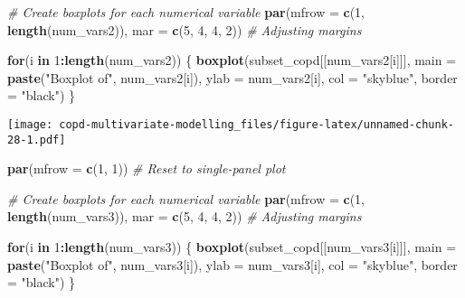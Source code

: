 \documentclass[
]{article}
\newenvironment{Shaded}{\begin{snugshade}}{\end{snugshade}}
\newcommand{\AttributeTok}[1]{\textcolor[rgb]{0.13,0.29,0.53}{#1}}
\newcommand{\CommentTok}[1]{\textcolor[rgb]{0.56,0.35,0.01}{\textit{#1}}}
\newcommand{\ControlFlowTok}[1]{\textcolor[rgb]{0.13,0.29,0.53}{\textbf{#1}}}
\newcommand{\DecValTok}[1]{\textcolor[rgb]{0.00,0.00,0.81}{#1}}
\newcommand{\FunctionTok}[1]{\textcolor[rgb]{0.13,0.29,0.53}{\textbf{#1}}}
\newcommand{\NormalTok}[1]{#1}
\newcommand{\SpecialCharTok}[1]{\textcolor[rgb]{0.81,0.36,0.00}{\textbf{#1}}}
\newcommand{\StringTok}[1]{\textcolor[rgb]{0.31,0.60,0.02}{#1}}
\begin{document}
\begin{Shaded}
\begin{Highlighting}[]
\CommentTok{\# Create boxplots for each numerical variable}
\FunctionTok{par}\NormalTok{(}\AttributeTok{mfrow =} \FunctionTok{c}\NormalTok{(}\DecValTok{1}\NormalTok{, }\FunctionTok{length}\NormalTok{(num\_vars2)), }\AttributeTok{mar =} \FunctionTok{c}\NormalTok{(}\DecValTok{5}\NormalTok{, }\DecValTok{4}\NormalTok{, }\DecValTok{4}\NormalTok{, }\DecValTok{2}\NormalTok{))  }\CommentTok{\# Adjusting margins}

\ControlFlowTok{for}\NormalTok{(i }\ControlFlowTok{in} \DecValTok{1}\SpecialCharTok{:}\FunctionTok{length}\NormalTok{(num\_vars2)) \{}
  \FunctionTok{boxplot}\NormalTok{(subset\_copd[[num\_vars2[i]]], }\AttributeTok{main =} \FunctionTok{paste}\NormalTok{(}\StringTok{"Boxplot of"}\NormalTok{, num\_vars2[i]), }
          \AttributeTok{ylab =}\NormalTok{ num\_vars2[i], }\AttributeTok{col =} \StringTok{"skyblue"}\NormalTok{, }\AttributeTok{border =} \StringTok{"black"}\NormalTok{)}
\NormalTok{\}}
\end{Highlighting}
\end{Shaded}

\texttt{[image: copd-multivariate-modelling\_files/figure-latex/unnamed-chunk-28-1.pdf]}

\begin{Shaded}
\begin{Highlighting}[]
\FunctionTok{par}\NormalTok{(}\AttributeTok{mfrow =} \FunctionTok{c}\NormalTok{(}\DecValTok{1}\NormalTok{, }\DecValTok{1}\NormalTok{))  }\CommentTok{\# Reset to single{-}panel plot}
\end{Highlighting}
\end{Shaded}

\begin{Shaded}
\begin{Highlighting}[]
\CommentTok{\# Create boxplots for each numerical variable}
\FunctionTok{par}\NormalTok{(}\AttributeTok{mfrow =} \FunctionTok{c}\NormalTok{(}\DecValTok{1}\NormalTok{, }\FunctionTok{length}\NormalTok{(num\_vars3)), }\AttributeTok{mar =} \FunctionTok{c}\NormalTok{(}\DecValTok{5}\NormalTok{, }\DecValTok{4}\NormalTok{, }\DecValTok{4}\NormalTok{, }\DecValTok{2}\NormalTok{))  }\CommentTok{\# Adjusting margins}

\ControlFlowTok{for}\NormalTok{(i }\ControlFlowTok{in} \DecValTok{1}\SpecialCharTok{:}\FunctionTok{length}\NormalTok{(num\_vars3)) \{}
  \FunctionTok{boxplot}\NormalTok{(subset\_copd[[num\_vars3[i]]], }\AttributeTok{main =} \FunctionTok{paste}\NormalTok{(}\StringTok{"Boxplot of"}\NormalTok{, num\_vars3[i]), }
          \AttributeTok{ylab =}\NormalTok{ num\_vars3[i], }\AttributeTok{col =} \StringTok{"skyblue"}\NormalTok{, }\AttributeTok{border =} \StringTok{"black"}\NormalTok{)}
\NormalTok{\}}
\end{Highlighting}
\end{Shaded}
\end{document}
